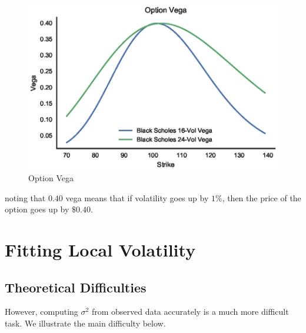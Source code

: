 \documentclass[12pt]{article}
\numberwithin{equation}{section}
\newcommand{\diff}[2]{\frac{\partial #1}{\partial #2}}
\begin{document}
\begin{figure}[h!]
\centering
\includegraphics{figs/vega.eps}
\caption{Option Vega}
\label{fig:vega}
\end{figure}

\noindent noting that $0.40$ vega means that if volatility goes up by $1\%$,
then the price of the option goes up by $\$0.40$. 


\section{Fitting Local Volatility}
\label{sec:localvolfitting}





\subsection{Theoretical Difficulties}
However, computing $\sigma^2$ from observed data accurately is a much more
difficult task. We illustrate the main difficulty below.
\end{document}
